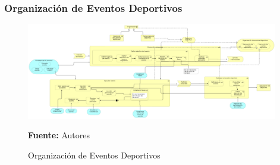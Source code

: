 \subsubsection{Organización de Eventos Deportivos}

\begin{figure}[!htb]
  \begin{center}
    \includegraphics[width=11cm]{./imagenes/business_process/organizacioneventosdeportivos.png}
    \caption{Organización de Eventos Deportivos}
    \label{fig:bp_organizacion_eventos_deportivos}
    \textbf{Fuente:}  Autores
  \end{center}
\end{figure}

